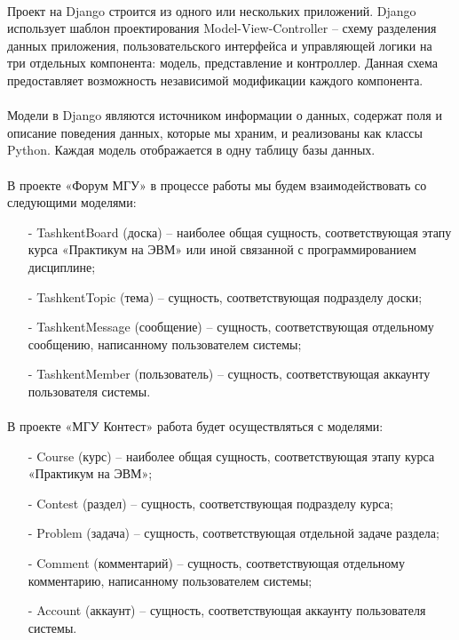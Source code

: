 \documentclass[12pt, a4paper, oneside]{article}
\begin{document}
\paragraph{}
Проект на Django строится из одного или нескольких приложений. Django использует шаблон проектирования Model-View-Controller \cite{mvc} – схему разделения данных приложения, пользовательского интерфейса и управляющей логики на три отдельных компонента: модель, представление и контроллер. Данная схема предоставляет возможность независимой модификации каждого компонента.
\paragraph{}
Модели в Django являются источником информации о данных, содержат поля и описание поведения данных, которые мы храним, и реализованы как классы Python. Каждая модель отображается в одну таблицу базы данных.
\paragraph{}
В проекте «Форум МГУ» в процессе работы мы будем взаимодействовать со следующими моделями:
\begin{itemize}
    \item[-] TashkentBoard (доска) – наиболее общая сущность, соответствующая этапу курса «Практикум на ЭВМ» или иной связанной с программированием дисциплине;
    \item[-] TashkentTopic (тема) – сущность, соответствующая подразделу доски;
    \item[-] TashkentMessage (сообщение) – сущность, соответствующая отдельному сообщению, написанному пользователем системы;
    \item[-] TashkentMember (пользователь) – сущность, соответствующая аккаунту пользователя системы.
\end{itemize}
\paragraph{}
В проекте «МГУ Контест» работа будет осуществляться с моделями:
\begin{itemize}
    \item[-] Course (курс) – наиболее общая сущность, соответствующая этапу курса «Практикум на ЭВМ»;
    \item[-] Contest (раздел) – сущность, соответствующая подразделу курса;
    \item[-] Problem (задача) – сущность, соответствующая отдельной задаче раздела;
    \item[-] Comment (комментарий) – сущность, соответствующая отдельному комментарию, написанному пользователем системы; 
    \item[-] Account (аккаунт) – сущность, соответствующая аккаунту пользователя системы.
\end{itemize}
\end{document}
